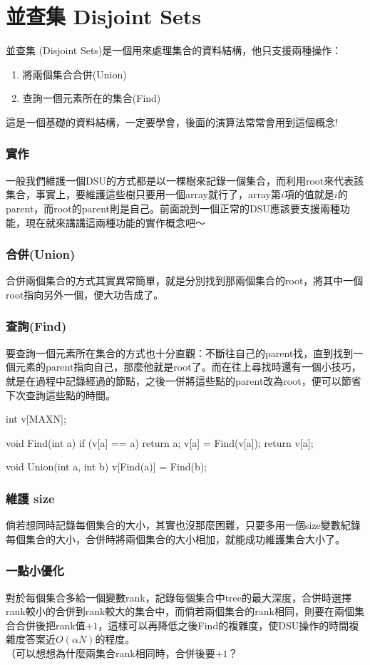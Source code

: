 \chapter{並查集 Disjoint Sets}
	並查集 (Disjoint Sets)是一個用來處理集合的資料結構，他只支援兩種操作：
	\begin{enumerate}
		\item 將兩個集合合併(Union)
		\item 查詢一個元素所在的集合(Find)
	\end{enumerate}
	這是一個基礎的資料結構，一定要學會，後面的演算法常常會用到這個概念!
		
	\subsection{實作}
	一般我們維護一個DSU的方式都是以一棵樹來記錄一個集合，而利用root來代表該集合，事實上，要維護這些樹只要用一個array就行了，array第$i$項的值就是$i$的parent，而root的parent則是自己。前面說到一個正常的DSU應該要支援兩種功能，現在就來講講這兩種功能的實作概念吧～
	\subsection{合併(Union)}
	合併兩個集合的方式其實異常簡單，就是分別找到那兩個集合的root，將其中一個root指向另外一個，便大功告成了。
	\subsection{查詢(Find)}
	要查詢一個元素所在集合的方式也十分直觀：不斷往自己的parent找，直到找到一個元素的parent指向自己，那麼他就是root了。而在往上尋找時還有一個小技巧，就是在過程中記錄經過的節點，之後一併將這些點的parent改為root，便可以節省下次查詢這些點的時間。
	\begin{C++}
int v[MAXN];

void Find(int a) {
	if (v[a] == a) return a;
	v[a] = Find(v[a]);
	return v[a];
}

void Union(int a, int b) {
	v[Find(a)] = Find(b);
}
	\end{C++}
	\subsection{維護 size}
	倘若想同時記錄每個集合的大小，其實也沒那麼困難，只要多用一個size變數紀錄每個集合的大小，合併時將兩個集合的大小相加，就能成功維護集合大小了。
	\subsection{一點小優化}
	對於每個集合多給一個變數rank，記錄每個集合中tree的最大深度，合併時選擇rank較小的合併到rank較大的集合中，而倘若兩個集合的rank相同，則要在兩個集合合併後把rank值$+1$，這樣可以再降低之後Find的複雜度，使DSU操作的時間複雜度答案近$O(\alpha{N})$的程度。\\
	（可以想想為什麼兩集合rank相同時，合併後要$+1$？